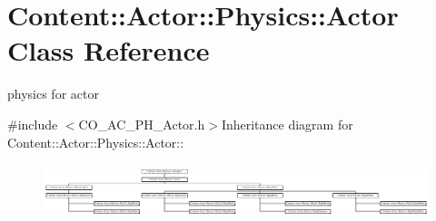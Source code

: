\hypertarget{classContent_1_1Actor_1_1Physics_1_1Actor}{
\section{Content::Actor::Physics::Actor Class Reference}
\label{classContent_1_1Actor_1_1Physics_1_1Actor}
}


physics for actor  


{\ttfamily \#include $<$CO\_\-AC\_\-PH\_\-Actor.h$>$}Inheritance diagram for Content::Actor::Physics::Actor::\begin{figure}[H]
\begin{center}
\leavevmode
\includegraphics[height=1.62791cm]{classContent_1_1Actor_1_1Physics_1_1Actor}
\end{center}
\end{figure}
